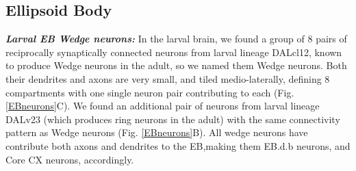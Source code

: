 


    \subsection{Ellipsoid Body}

    
    \textbf{\textit{Larval EB Wedge neurons:}}
    In the larval brain, we found a group of 8 pairs of reciprocally synaptically connected neurons from larval lineage DALcl12, known to produce Wedge neurons in the adult, so we named them Wedge neurons.
    Both their dendrites and axons are very small, and tiled medio-laterally, defining 8 compartments with one single neuron pair contributing to each (Fig. \ref{EBneurons}C).
    We found an additional pair of neurons from larval lineage DALv23 (which produces ring neurons in the adult) with the same connectivity pattern as Wedge neurons (Fig. \ref{EBneurons}B). All wedge neurons have contribute both axons and dendrites to the EB,making them EB.d.b neurons, and Core CX neurons, accordingly.

